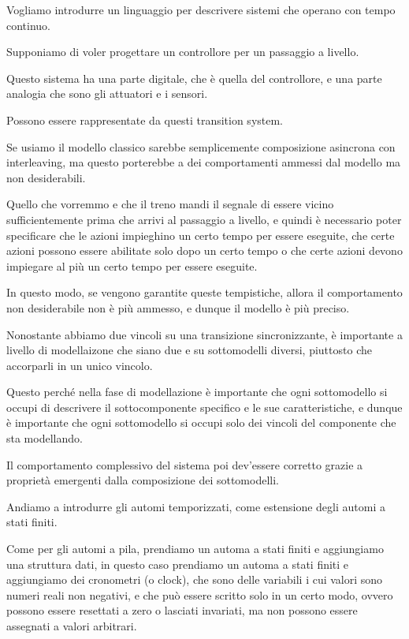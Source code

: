 Vogliamo introdurre un linguaggio per descrivere sistemi che operano con tempo continuo.

Supponiamo di voler progettare un controllore per un passaggio a livello.

Questo sistema ha una parte digitale, che è quella del controllore, e una parte analogia che sono gli attuatori e i sensori.

Possono essere rappresentate da questi transition system.

Se usiamo il modello classico sarebbe semplicemente composizione asincrona con interleaving, ma questo porterebbe a dei comportamenti ammessi dal modello ma non desiderabili.


Quello che vorremmo e che il treno mandi il segnale di essere vicino sufficientemente prima che arrivi al passaggio a livello, e quindi è necessario poter specificare che le azioni impieghino un certo tempo per essere eseguite, che certe azioni possono essere abilitate solo dopo un certo tempo o che certe azioni devono impiegare al più un certo tempo per essere eseguite.


In questo modo, se vengono garantite queste tempistiche, allora il comportamento non desiderabile non è più ammesso, e dunque il modello è più preciso.


\begin{note}{}
  Nonostante abbiamo due vincoli su una transizione sincronizzante, è importante a livello di modellaizone che siano due e su sottomodelli diversi, piuttosto che accorparli in un unico vincolo.

  Questo perché nella fase di modellazione è importante che ogni sottomodello si occupi di descrivere il sottocomponente specifico e le sue caratteristiche, e dunque è importante che ogni sottomodello si occupi solo dei vincoli del componente che sta modellando.

  Il comportamento complessivo del sistema poi dev'essere corretto grazie a proprietà emergenti dalla composizione dei sottomodelli.
\end{note}

Andiamo a introdurre gli automi temporizzati, come estensione degli automi a stati finiti.

Come per gli automi a pila, prendiamo un automa a stati finiti e aggiungiamo una struttura dati, in questo caso prendiamo un automa a stati finiti e aggiungiamo dei cronometri (o clock), che sono delle variabili i cui valori sono numeri reali non negativi, e che può essere scritto solo in un certo modo, ovvero possono essere resettati a zero o lasciati invariati, ma non possono essere assegnati a valori arbitrari.

